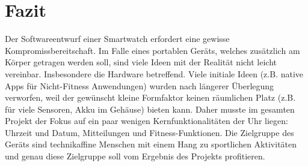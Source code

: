 \chapter{Fazit}

Der Softwareentwurf einer Smartwatch erfordert eine gewisse Kompromissbereitschaft. Im Falle eines portablen Geräts, welches zusätzlich am Körper getragen werden soll, sind viele Ideen mit der Realität nicht leicht vereinbar. Insbesondere die Hardware betreffend. Viele initiale Ideen (z.B. \gls{native} Apps für Nicht-Fitness Anwendungen) wurden nach längerer Überlegung verworfen, weil der gewünscht kleine Formfaktor keinen räumlichen Platz (z.B. für viele Sensoren, Akku im Gehäuse) bieten kann. Daher musste im gesamten Projekt der Fokus auf ein paar wenigen Kernfunktionalitäten der Uhr liegen: Uhrzeit und Datum, Mitteilungen und Fitness-Funktionen. Die Zielgruppe des Geräts sind technikaffine Menschen mit einem Hang zu sportlichen Aktivitäten und genau diese Zielgruppe soll vom Ergebnis des Projekts profitieren.
